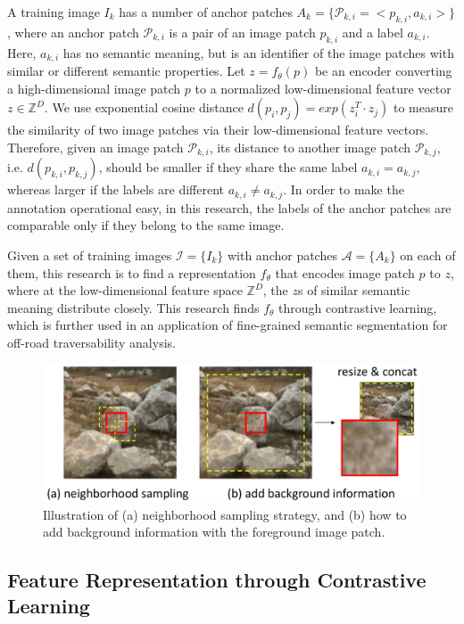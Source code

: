\documentclass[letterpaper, 10 pt, conference]{ieeeconf}  %
\begin{document}
A training image $I_k$ has a number of anchor patches $A_k=\{\mathcal{P}_{k,i}=<p_{k,i},a_{k,i}>\}$, where an anchor patch $\mathcal{P}_{k,i}$ is a pair of an image patch $p_{k,i}$ and a label $a_{k,i}$. Here, $a_{k,i}$ has no semantic meaning, but is an identifier of the image patches with similar or different semantic properties.
Let $z=f_{\theta}(p)$ be an encoder converting a high-dimensional image patch $p$ to a normalized low-dimensional feature vector $z\in \mathbb{Z}^D$. 
We use exponential cosine distance $d(p_i,p_j)=exp(z_i^T \cdot z_j)$ to measure the similarity of two image patches via their low-dimensional feature vectors.
Therefore, given an image patch $\mathcal{P}_{k,i}$, its distance to another image patch $\mathcal{P}_{k,j}$, i.e. $d(p_{k,i},p_{k,j})$, should be smaller if they share the same label $a_{k,i}=a_{k,j}$, whereas larger if the labels are different $a_{k,i} \neq a_{k,j}$.
In order to make the annotation operational easy, in this research, the labels of the anchor patches are comparable only if they belong to the same image.

Given a set of training images $\mathcal{I}=\{I_k\}$ with anchor patches $\mathcal{A}=\{A_k\}$ on each of them, this research is to find a representation $f_{\theta}$ that encodes image patch $p$ to $z$, where at the low-dimensional feature space $\mathbb{Z}^D$, the $z$s of similar semantic meaning distribute closely. 
This research finds $f_{\theta}$ through contrastive learning, which is further used in an application of fine-grained semantic segmentation for off-road traversability analysis.

\begin{figure}[]
	\centering
	\includegraphics[scale=0.235]{dataaug.pdf}
	\caption{Illustration of (a) neighborhood sampling strategy, and (b) how to add background information with the foreground image patch.}
	\label{fig:dataaug}
\end{figure}

\subsection{Feature Representation through Contrastive Learning}
\end{document}
